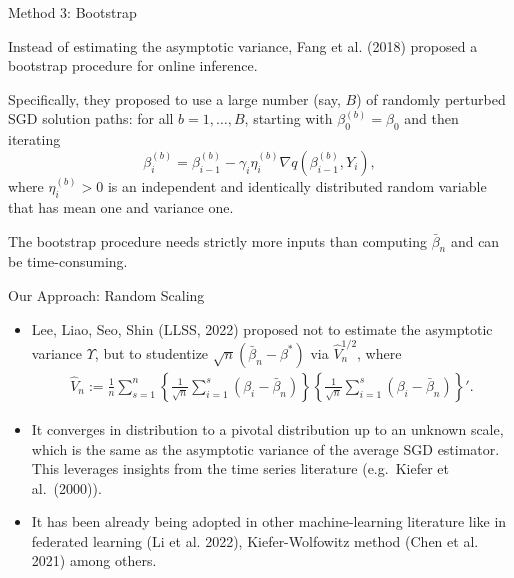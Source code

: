 \documentclass[beamer, t]{beamer}
\newcommand{\tcb}{\textcolor{blue}}
\begin{document}
\begin{frame}{Method 3: Bootstrap}


Instead of estimating the asymptotic variance, Fang et al. (2018) proposed a  bootstrap procedure  for  online inference.

\bigskip
Specifically, they proposed to use a large number (say, $B$) of randomly perturbed
SGD solution paths: for all $b = 1, \ldots, B$, starting with $\beta_0^{(b)} = \beta_0$ and then iterating
\begin{equation*}
\beta_{i}^{(b)}=\beta_{i-1}^{(b)}-\gamma_{i} \eta_i^{(b)} \nabla q\left(\beta_{i-1}^{(b)},Y_{i}\right),
\label{eq:SGD1:bt}
\end{equation*}
where $\eta_i^{(b)} > 0$ is an independent and identically distributed random variable that has mean one and variance one.


\bigskip
The bootstrap procedure needs strictly more inputs than computing $\bar{\beta}_{n}$
and can be time-consuming.

\end{frame}



\begin{frame}{Our Approach: Random Scaling}

\begin{itemize}
	\item Lee, Liao, Seo, Shin (LLSS, 2022) proposed not to estimate the asymptotic variance $\Upsilon$,  but to studentize   $\sqrt{n}\left(\bar{\beta}_{n}-\beta^{*}\right)$ via $ \widehat{V}_{n}^{1/2} $, where
	\begin{align*}\label{def:random-scaling}
	\widehat{V}_{n} := \frac{1}{n}\sum_{s=1}^{n}
	\left\{ \frac{1}{\sqrt{n}} \sum_{i=1}^{s} \left( \beta_{i}-\bar{\beta}_{n} \right) \right \}
	\left\{ \frac{1}{\sqrt{n}} \sum_{i=1}^{s} \left( \beta_{i}-\bar{\beta}_{n} \right) \right \}'.
	\end{align*}
	
	\item
	It converges in distribution to a pivotal distribution up to an unknown scale, which is the same as the asymptotic variance of the average SGD estimator. 
	This leverages insights from the time series literature (e.g.~Kiefer et al.~(2000)).
	
	\item It has been already being adopted in other machine-learning literature like in federated learning (Li et al. 2022), Kiefer-Wolfowitz method (Chen et al. 2021) among others.
	
	
	
	
\end{itemize}





\end{frame}
\end{document}
